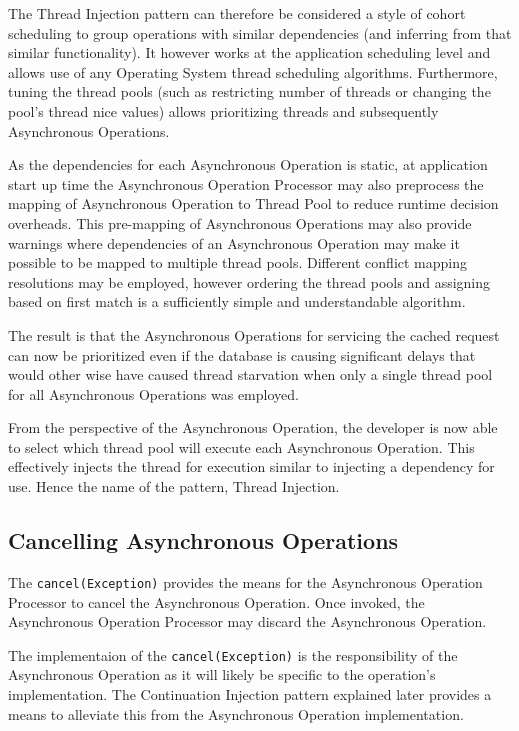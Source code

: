 \documentclass{article}
\begin{document}
The Thread Injection pattern can therefore be considered a style of cohort
scheduling \cite{cohort} to group operations with similar dependencies (and
inferring from that similar functionality).  It however works at the application
scheduling level and allows use of any Operating System thread scheduling
algorithms.  Furthermore, tuning the thread pools (such as restricting number of
threads or changing the pool's thread nice values) allows prioritizing threads and
subsequently Asynchronous Operations.

As the dependencies for each Asynchronous Operation is static, at application
start up time the Asynchronous Operation Processor may also preprocess the
mapping of Asynchronous Operation to Thread Pool to reduce runtime decision
overheads.  This pre-mapping of Asynchronous Operations may also provide
warnings where dependencies of an Asynchronous Operation may make it possible to
be mapped to multiple thread pools.  Different conflict mapping resolutions may
be employed, however ordering the thread pools and assigning based on first
match is a sufficiently simple and understandable algorithm.

The result is that the Asynchronous Operations for servicing the cached request
can now be prioritized even if the database is causing significant delays that
would other wise have caused thread starvation when only a single thread pool
for all Asynchronous Operations was employed.

From the perspective of the Asynchronous Operation, the developer is now able to
select which thread pool will execute each Asynchronous Operation.  This
effectively injects the thread for execution similar to injecting a dependency
for use.  Hence the name of the pattern, Thread Injection.


\subsection{Cancelling Asynchronous Operations}

The \texttt{cancel(Exception)} provides the means for the Asynchronous Operation
Processor to cancel the Asynchronous Operation.  Once invoked, the Asynchronous
Operation Processor may discard the Asynchronous Operation.

The implementaion of the \texttt{cancel(Exception)} is the responsibility of the
Asynchronous Operation as it will likely be specific to the operation's
implementation.  The Continuation Injection pattern explained later provides a
means to alleviate this from the Asynchronous Operation implementation.
\end{document}
